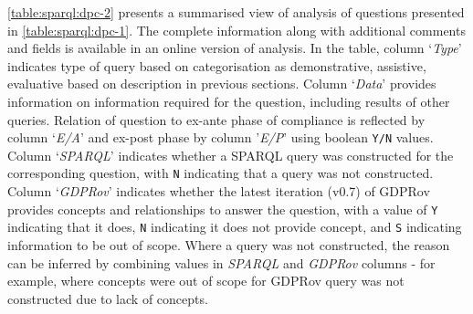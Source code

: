 \autoref{table:sparql:dpc-2} presents a summarised view of analysis of questions presented in \autoref{table:sparql:dpc-1}.
The complete information along with additional comments and fields is available in an online version of analysis.
In the table, column `\textit{Type}' indicates type of query based on categorisation as demonstrative, assistive, evaluative based on description in previous sections.
Column `\textit{Data}' provides information on information required for the question, including results of other queries.
Relation of question to ex-ante phase of compliance is reflected by column `\textit{E/A}' and ex-post phase by column '\textit{E/P}' using boolean \texttt{Y/N} values.
Column `\textit{SPARQL}' indicates whether a SPARQL query was constructed for the corresponding question, with \texttt{N} indicating that a query was not constructed.
Column `\textit{GDPRov}' indicates whether the latest iteration (v0.7) of GDPRov provides concepts and relationships to answer the question, with a value of \texttt{Y} indicating that it does, \texttt{N} indicating it does not provide concept, and \texttt{S} indicating information to be out of scope.
Where a query was not constructed, the reason can be inferred by combining values in \textit{SPARQL} and \textit{GDPRov} columns - for example, where concepts were out of scope for GDPRov query was not constructed due to lack of concepts. 
